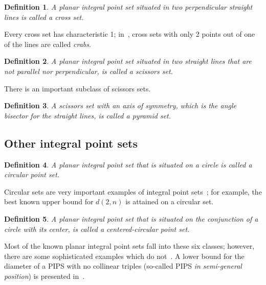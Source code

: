 \documentclass[12pt]{article}
\theoremstyle{theorem}
\theoremstyle{dfn}
\newtheorem{dfn}{Definition}
\theoremstyle{remark}
\begin{document}
\begin{dfn}
	A planar integral point set situated in two perpendicular straight lines
	is called a \textit{cross} set.
\end{dfn}
Every cross set has characteristic 1;
in~\cite{antonov2008maximal}, cross sets with only 2 points out of one of the lines are called \textit{crabs}.

\begin{dfn}
	A planar integral point set situated in two straight lines
	that are not parallel nor perpendicular,
	is called a \textit{scissors} set.
\end{dfn}

There is an important subclass of scissors sets.

\begin{dfn}
	A scissors set with an axis of symmetry,
	which is the angle bisector for the straight lines,
	is called a \textit{pyramid} set.
\end{dfn}



\subsection{Other integral point sets}

\begin{dfn}
	A planar integral point set that is situated on a circle is called a \textit{circular}
	point set.
\end{dfn}

Circular sets are very important examples
of integral point sets~\cite{harborth1993upper,piepmeyer1996maximum,bat2018number};
for example, the best known upper bound for $d(2,n)$
is attained on a circular set.


\begin{dfn}
	A planar integral point set that is situated on the conjunction of a circle with its center,
	is called a \textit{centered-circular} point set.
\end{dfn}

Most of the known planar integral point sets fall into these six classes;
however, there are some sophisticated examples which do not~\cite{kreisel2008heptagon,kurz2013constructing,avdeev2021particular}.
A lower bound for the diameter of a PIPS with no collinear triples (so-called PIPS \textit{in semi-general position})
is presented in~\cite{my-semi-general-5-4-bound-2019}.
\end{document}
